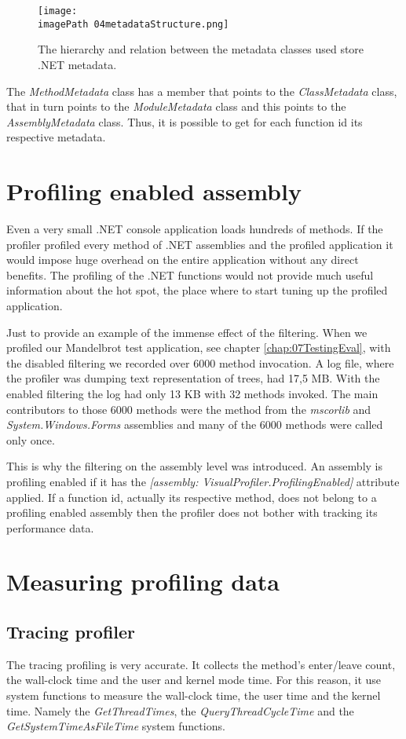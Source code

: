 \begin{figure}
	\centering
		\texttt{[image: \\imagePath 04metadataStructure.png]}
		\caption{The hierarchy and relation between the metadata classes used store .NET metadata.}
	\label{fig:04metadataStructure}
\end{figure}

The \textit{MethodMetadata} class has a member that points to the \textit{ClassMetadata} class, that in turn points to the \textit{ModuleMetadata} class and this points to the \textit{AssemblyMetadata} class. Thus, it is possible to get for each function id its respective metadata.

\section{Profiling enabled assembly}
\label{subsubsec:04ProfEnabAssem}
Even a very small .NET console application loads hundreds of methods. If the profiler profiled every method of .NET assemblies and the profiled application it would impose huge overhead on the entire application without any direct benefits. The profiling of the .NET functions would not provide much useful information about the hot spot, the place where to start tuning up the profiled application. 

Just to provide an example of the immense effect of the filtering. When we profiled our Mandelbrot test application, see chapter \ref{chap:07TestingEval}, with the disabled filtering we recorded over 6000 method invocation. A log file, where the profiler was dumping text representation of trees, had 17,5 MB. With the enabled filtering the log had only 13 KB with 32 methods invoked. The main contributors to those 6000 methods were the method from the \textit{mscorlib} and \textit{System.Windows.Forms} assemblies and many of the 6000 methods were called only once.

This is why the filtering on the assembly level was introduced. An assembly is profiling enabled if it has the \textit{[assembly: VisualProfiler.ProfilingEnabled]} attribute applied. If a function id, actually its respective method, does not belong to a profiling enabled assembly then the profiler does not bother with tracking its performance data.

\section{Measuring profiling data}
\subsection{Tracing profiler}
The tracing profiling is very accurate. It collects the method's enter/leave count, the wall-clock time and the user and kernel mode time. For this reason, it use system functions to measure the wall-clock time, the user time and the kernel time. Namely the \textit{GetThreadTimes}, the \textit{QueryThreadCycleTime} and the \textit{GetSystemTimeAsFileTime} system functions.

